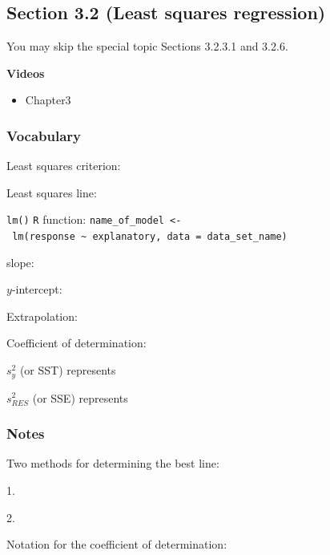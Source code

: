 \documentclass[
]{report}
\providecommand{\tightlist}{%
  \setlength{\itemsep}{0pt}\setlength{\parskip}{0pt}}
\newcommand{\rgs}{\vspace{12pt}} %
\newcommand{\rgi}{\hspace{24pt}}  %
\begin{document}
\hypertarget{section-3.2-least-squares-regression}{%
\subsection*{Section 3.2 (Least squares regression)}\label{section-3.2-least-squares-regression}}


You may skip the special topic Sections 3.2.3.1 and 3.2.6.

\textbf{Videos}

\begin{itemize}
\tightlist
\item
  Chapter3
\end{itemize}


\hypertarget{vocabulary-7}{%
\subsubsection*{Vocabulary}\label{vocabulary-7}}

Least squares criterion:
\rgs

Least squares line:
\rgs

\texttt{lm()} \texttt{R} function:
\rgi \texttt{name\_of\_model\ \textless{}-\ lm(response\ \textasciitilde{}\ explanatory,\ data\ =\ data\_set\_name)}

\rgs

slope:
\rgs

\(y\)-intercept:\\
\rgs

Extrapolation:
\rgs 

Coefficient of determination:

\rgi \(s_y^2\) (or SST) represents
\rgs

\rgi \(s_{RES}^2\) (or SSE) represents
\rgs

\hypertarget{notes-9}{%
\subsubsection*{Notes}\label{notes-9}}

Two methods for determining the best line:

\rgi 1.
\rgs

\rgi 2.
\rgs

Notation for the coefficient of determination:
\rgs
\end{document}
